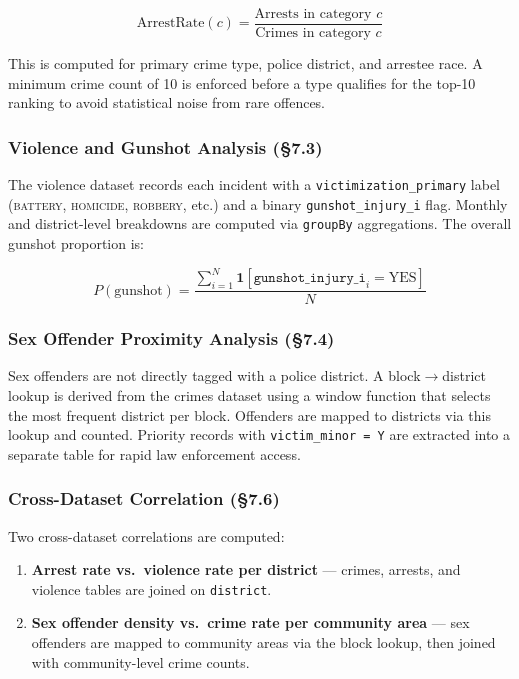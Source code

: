 \documentclass[11pt,a4paper]{article}
\begin{document}
\begin{equation}
\text{ArrestRate}(c) = \frac{\text{Arrests in category } c}{\text{Crimes in category } c}
\end{equation}

This is computed for primary crime type, police district, and arrestee
race. A minimum crime count of 10 is enforced before a type qualifies
for the top-10 ranking to avoid statistical noise from rare offences.

\subsubsection{Violence and Gunshot Analysis (§7.3)}
The violence dataset records each incident with a
\texttt{victimization\_primary} label (\textsc{battery}, \textsc{homicide},
\textsc{robbery}, etc.) and a binary \texttt{gunshot\_injury\_i} flag.
Monthly and district-level breakdowns are computed via \texttt{groupBy}
aggregations. The overall gunshot proportion is:

\begin{equation}
P(\text{gunshot}) = \frac{\sum_{i=1}^{N} \mathbf{1}[\texttt{gunshot\_injury\_i}_i = \text{YES}]}{N}
\end{equation}

\subsubsection{Sex Offender Proximity Analysis (§7.4)}
Sex offenders are not directly tagged with a police district. A
block$\to$district lookup is derived from the crimes dataset using a
window function that selects the most frequent district per block.
Offenders are mapped to districts via this lookup and counted. Priority
records with \texttt{victim\_minor = Y} are extracted into a separate
table for rapid law enforcement access.

\subsubsection{Cross-Dataset Correlation (§7.6)}
Two cross-dataset correlations are computed:
\begin{enumerate}[noitemsep]
  \item \textbf{Arrest rate vs.\ violence rate per district} — crimes,
    arrests, and violence tables are joined on \texttt{district}.
  \item \textbf{Sex offender density vs.\ crime rate per community area}
    — sex offenders are mapped to community areas via the block lookup,
    then joined with community-level crime counts.
\end{enumerate}
\end{document}
